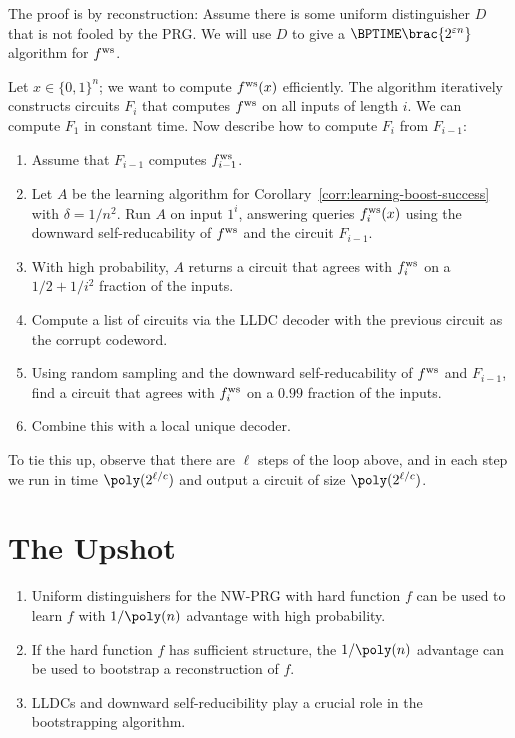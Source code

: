 \begin{proofsk}
  The proof is by reconstruction: Assume there is some uniform distinguisher
  $D$ that is not fooled by the PRG. We will use $D$ to give a
  $\BPTIME\brac{2^{\eps n}}$ algorithm for $ f^{\text{ws}} $.

  Let $x \in \{0, 1\}^n$; we want to compute $ f^{\text{ws}} (x)$ efficiently. The
  algorithm iteratively constructs circuits $F_i$ that computes $ f^{\text{ws}} $ on all
  inputs of length $i$. We can compute $F_1$ in constant time. Now describe how
  to compute $F_i$ from $F_{i-1}$:
  \begin{enumerate}
    \item Assume that $F_{i - 1}$ computes $ f^{\text{ws}} _{i - 1}$.
    \item Let $A$ be the learning algorithm for
      Corollary~\ref{corr:learning-boost-success} with $\delta = 1/n^2$. Run
      $A$ on input $1^i$, answering queries $ f^{\text{ws}} _i(x)$ using the downward
      self-reducability of $ f^{\text{ws}} $ and the circuit $F_{i - 1}$.
    \item With high probability, $A$ returns a circuit that agrees with
      $ f^{\text{ws}} _i$ on a $1/2 + 1/i^2$ fraction of the inputs.
    \item Compute a list of circuits via the LLDC decoder with the previous
      circuit as the corrupt codeword.
    \item Using random sampling and the downward self-reducability of $ f^{\text{ws}} $
      and $F_{i - 1}$, find a circuit that agrees with $ f^{\text{ws}} _i$ on a $0.99$
      fraction of the inputs.
    \item Combine this with a local unique decoder.
  \end{enumerate}
  To tie this up, observe that there are $\ell$ steps of the loop above, and in
  each step we run in time $\poly(2^{\ell / c})$ and output a circuit of size
  $\poly(2^{\ell / c})$.
\end{proofsk}

\section*{The Upshot}

\begin{enumerate}
  \item Uniform distinguishers for the NW-PRG with hard function $f$ can be
    used to learn $f$ with $1/\poly(n)$ advantage with high probability.
  \item If the hard function $f$ has sufficient structure, the $1/\poly(n)$
    advantage can be used to bootstrap a reconstruction of $f$.
  \item LLDCs and downward self-reducibility play a crucial role in the
    bootstrapping algorithm.
\end{enumerate}
